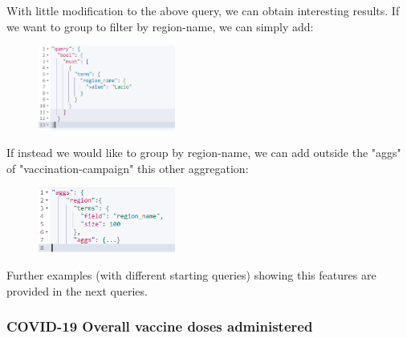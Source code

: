 \documentclass{article}[IEEEtran]
\begin{document}
With little modification to the above query, we can obtain interesting results. If we want to group to filter by region-name, we can simply add: 
\begin{figure}[H]
    \includegraphics[width=0.4\textwidth, frame]{Query_1.1.png}
\end{figure}
If instead we would like to group by region-name, we can add outside the "aggs" of "vaccination-campaign" this other aggregation:
\begin{figure}[H]
    \includegraphics[width=0.4\textwidth, frame]{Query_1,2.png}
\end{figure}

Further examples (with different starting queries) showing this features are provided in the next queries.

\subsubsection{COVID-19 Overall vaccine doses administered}\label{ssec:q2}
\end{document}
